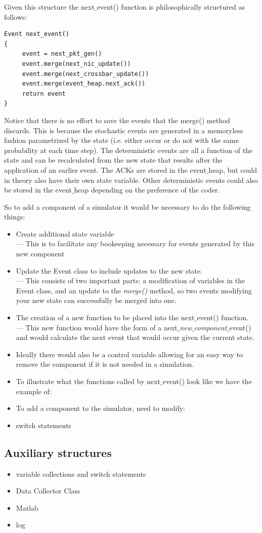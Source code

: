 \documentclass{IEEEtran}%
\begin{document}
Given this structure the next$\_$event() function is philosophically structured as follows:

\begin{verbatim}
Event next_event()
{
     event = next_pkt_gen()
     event.merge(next_nic_update())
     event.merge(next_crossbar_update())
     event.merge(event_heap.next_ack())
     return event
}
\end{verbatim}

Notice that there is no effort to save the events that the merge() method discards.  This is because the stochastic events are generated in a memoryless fashion parametrized by the state (i.e. either occur or do not with the same probability at each time step).  The deterministic events are all a function of the state and can be recalculated from the new state that results after the application of an earlier event.  The ACKs are stored in the event$\_$heap, but could in theory also have their own state variable.  Other deterministic events could also be stored in the event$\_$heap depending on the preference of the coder.

So to add a component of a simulator it would be necessary to do the following things:
\begin{itemize}
\item Create additional state variable\\
--- This is to facilitate any bookeeping necessary for events generated by this new component
\item Update the Event class to include updates to the new state.\\
--- This consists of two important parts: a modification of variables in the Event class, and an update to the {\it merge()} method, so two events modifying your new state can successfully be merged into one.
\item The creation of a new function to be placed into the next$\_$event() function.\\
--- This new function would have the form of a next$\_${\it new$\_$component}$\_$event() and would calculate the next event that would occur given the current state.
\item Ideally there would also be a control variable allowing for an easy way to remove the component if it is not needed in a simulation.
\end{itemize}

\begin{itemize}
\item To illustrate what the functions called by next$\_$event() look like we have the example of:
\item To add a component to the simulator, need to modify:
\item switch statements 
\end{itemize}
\subsection{Auxiliary structures}
\begin{itemize}
\item variable collections and switch statements
\item Data Collector Class
\item Matlab
\item log
\end{itemize}
\end{document}
